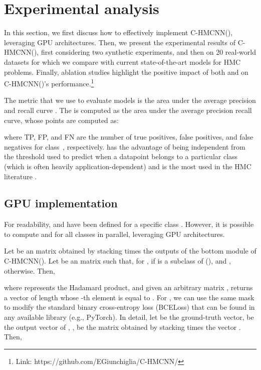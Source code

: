 \documentclass{article}
\newcommand{\module}{\text{MCM}}
\newcommand{\loss}{\text{MCLoss}}
\newcommand{\system}[1]{C-HMCNN(#1)}
\newcommand{\auprc}{}
\begin{document}
\section{Experimental analysis}\label{sec:experiments}

In this section, we first discuss how to effectively implement \system{}, leveraging GPU architectures. Then, we present the experimental results of \system{}, first considering two synthetic experiments, and then on 20 real-world datasets for which we compare with current state-of-the-art models for HMC problems. Finally, ablation studies highlight the positive impact of both \module{} and \loss{} on \system{}'s performance.\footnote{Link:  {https://github.com/EGiunchiglia/C-HMCNN/}} 


The metric that we use to evaluate models is the area under the average precision and recall curve \auprc. The \auprc{} is computed as the area under the average precision recall curve, whose points  are computed as:

where TP, FP, and FN are the number of true positives, false positives, and false negatives for class~, respectively.
\auprc{}  has the advantage of being independent from the threshold used to predict when a datapoint belongs to a particular class (which is often heavily application-dependent) and is the most used in the HMC literature \citep{kwok2011,vens2008,cerri2018}.



\subsection{GPU implementation}

For readability,  and  have been defined for a specific class . However, it is possible to compute  \module{} and \loss{} for all classes in parallel, 
leveraging GPU architectures.


 Let  be an  matrix obtained by stacking  times the  outputs of the bottom module  of \system{}. Let  be an  matrix such that, for ,  if  is a subclass of  (), and , otherwise. Then, 

where  represents the Hadamard product, and given an arbitrary  matrix ,  returns a vector of length  whose -th element is equal to . For \loss{}, we can use the same mask  to modify the standard binary cross-entropy loss (BCELoss) that can be found in any available library (e.g., PyTorch). In detail, let  be the ground-truth vector,  be the output vector of , ,  be the  matrix obtained by stacking  times the vector . Then, 
\end{document}
